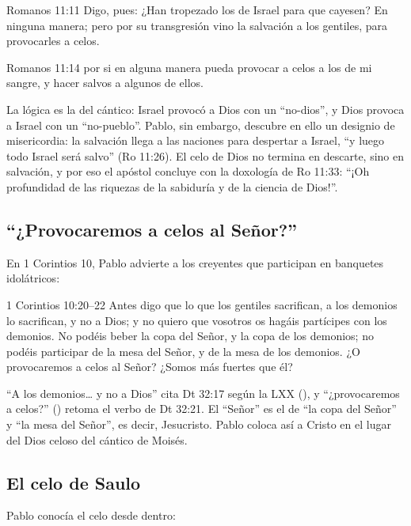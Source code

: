 \begin{verso}{Romanos 11:11}
Digo, pues: ¿Han tropezado los de Israel para que cayesen? En ninguna manera; pero por su transgresión vino la salvación a los gentiles, para provocarles a celos.
\end{verso}
\begin{verso}{Romanos 11:14}
por si en alguna manera pueda provocar a celos a los de mi sangre, y hacer salvos a algunos de ellos.
\end{verso}

La lógica es la del cántico: Israel provocó a Dios con un ``no-dios'', y Dios provoca a Israel con un ``no-pueblo''. Pablo, sin embargo, descubre en ello un designio de misericordia: la salvación llega a las naciones para despertar a Israel, ``y luego todo Israel será salvo'' (Ro 11:26). El celo de Dios no termina en descarte, sino en salvación, y por eso el apóstol concluye con la doxología de Ro 11:33: ``¡Oh profundidad de las riquezas de la sabiduría y de la ciencia de Dios!''.

\subsection{“¿Provocaremos a celos al Señor?”}
En 1 Corintios 10, Pablo advierte a los creyentes que participan en banquetes idolátricos:

\begin{verso}{1 Corintios 10:20–22}
Antes digo que lo que los gentiles sacrifican, a los demonios lo sacrifican, y no a Dios; y no quiero que vosotros os hagáis partícipes con los demonios. No podéis beber la copa del Señor, y la copa de los demonios; no podéis participar de la mesa del Señor, y de la mesa de los demonios. ¿O provocaremos a celos al Señor? ¿Somos más fuertes que él?
\end{verso}

``A los demonios\ldots{} y no a Dios'' cita Dt 32:17 según la LXX (), y ``¿provocaremos a celos?'' () retoma el verbo de Dt 32:21. El ``Señor'' es el de ``la copa del Señor'' y ``la mesa del Señor'', es decir, Jesucristo. Pablo coloca así a Cristo en el lugar del Dios celoso del cántico de Moisés.


\subsection{El celo de Saulo}
Pablo conocía el celo desde dentro:

